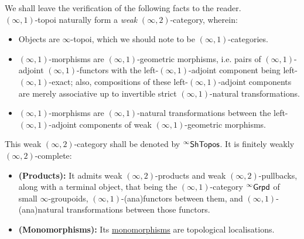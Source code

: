                 \begin{remark} \label{remark: (infinity, 1)_topoi_categories}  
                    We shall leave the verification of the following facts to the reader.
                    \\
                    $(\infty, 1)$-topoi naturally form a \textit{weak} $(\infty, 2)$-category, wherein:
                        \begin{itemize}
                            \item Objects are $\infty$-topoi, which we should note to be $(\infty, 1)$-categories.
                            \item $(\infty, 1)$-morphisms are $(\infty, 1)$-geometric morphisms, i.e. pairs of $(\infty, 1)$-adjoint $(\infty, 1)$-functors with the left-$(\infty, 1)$-adjoint component being left-$(\infty, 1)$-exact; also, compositions of these left-$(\infty, 1)$-adjoint components are merely associative up to invertible strict $(\infty, 1)$-natural transformations.
                            \item $(\infty, 1)$-morphisms are $(\infty, 1)$-natural transformations between the left-$(\infty, 1)$-adjoint components of weak $(\infty, 1)$-geometric morphisms. 
                        \end{itemize}
                    This weak $(\infty, 2)$-category shall be denoted by ${}^{\infty}\mathsf{Sh}\mathsf{Topos}$. It is finitely weakly $(\infty, 2)$-complete:
                        \begin{itemize}
                            \item \textbf{(Products):} It admits weak $(\infty, 2)$-products and weak $(\infty, 2)$-pullbacks, along with a terminal object, that being the $(\infty, 1)$-category ${}^{\infty}\mathsf{Grpd}$ of small $\infty$-groupoids, $(\infty, 1)$-(ana)functors between them, and $(\infty, 1)$-(ana)natural transformations between those functors. 
                            \item \textbf{(Monomorphisms):} Its \href{https://ncatlab.org/nlab/show/monomorphism+in+an+\%28infinity\%2C1\%29-category}{\underline{monomorphisms}} are topological localisations.
                        \end{itemize}
                \end{remark}
        
